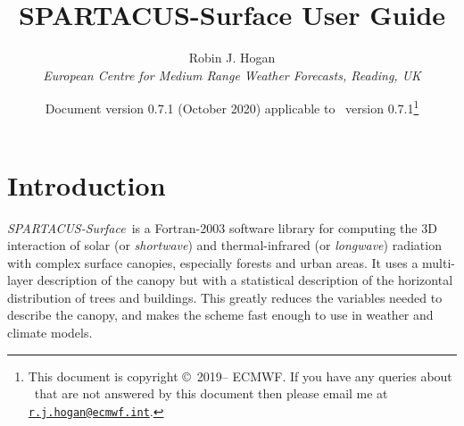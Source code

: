 \documentclass[a4,oneside]{article}
\title{SPARTACUS-Surface User Guide}
\author{Robin J. Hogan\\ \emph{European Centre for Medium Range
    Weather Forecasts, Reading, UK}}
\date{Document version 0.7.1 (October 2020) applicable to
  \spsurf\ version 0.7.1\thanks{This document is copyright
    \copyright\ 2019-- ECMWF. If you have any queries about
    \spsurf\ that are not answered by this document
%
%
    then please email me at
    \href{mailto:r.j.hogan@ecmwf.int}{\texttt{r.j.hogan@ecmwf.int}}.}}
\def\spsurf{\emph{SPARTACUS-Surface}}
\renewcommand\thefootnote{\relax}
\def\chapter{\section}
\begin{document}
\maketitle

\def\thefootnote{\fnsymbol{footnote}}

\chapter{Introduction}
\spsurf\ is a Fortran-2003 software library for computing the 3D
interaction of solar (or \emph{shortwave}) and thermal-infrared (or
\emph{longwave}) radiation with complex surface canopies, especially
forests and urban areas. It uses a multi-layer description of the
canopy but with a statistical description of the horizontal
distribution of trees and buildings. This greatly reduces the
variables needed to describe the canopy, and makes the scheme fast
enough to use in weather and climate models.
\end{document}
